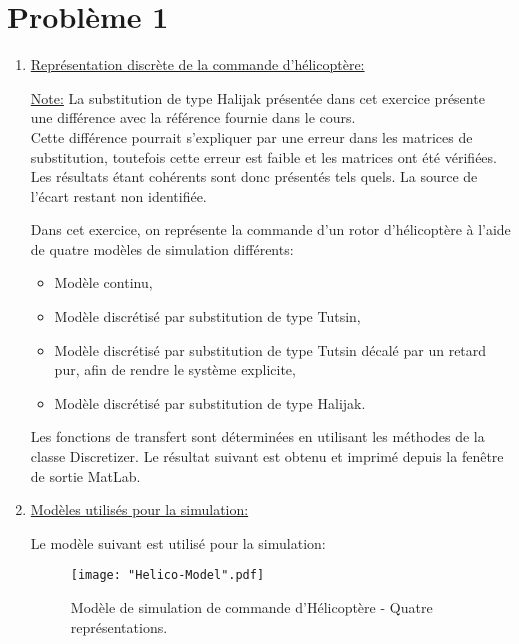 \documentclass[a4paper,12pt,fleqn]{article}
\begin{document}
\section{\textbf{Problème 1}}
\begin{enumerate}

\item \underline{Représentation discrète de la commande d'hélicoptère:}

 \underline{Note:}
 La substitution de type Halijak présentée dans cet exercice présente une différence avec la référence fournie dans le cours.\\
 Cette différence pourrait s'expliquer par une erreur dans les matrices de substitution, toutefois cette erreur est faible et les matrices ont été vérifiées.\\
 Les résultats étant cohérents sont donc présentés tels quels. La source de l'écart restant non identifiée.
 
Dans cet exercice, on représente la commande d'un rotor d'hélicoptère à l'aide de quatre modèles de simulation différents:

\begin{itemize}
  \item Modèle continu,
  \item Modèle discrétisé par substitution de type Tutsin,
  \item Modèle discrétisé par substitution de type Tutsin décalé par un retard pur, afin de rendre le système explicite,
  \item Modèle discrétisé par substitution de type Halijak.
\end{itemize}

Les fonctions de transfert sont déterminées en utilisant les méthodes de la classe Discretizer. Le résultat suivant est obtenu et imprimé depuis la fenêtre de sortie MatLab.



\item \underline{Modèles utilisés pour la simulation:}

Le modèle suivant est utilisé pour la simulation:

\begin{figure}[htb]
\centering
    \texttt{[image: "Helico-Model".pdf]}
    \caption{Modèle de simulation de commande d'Hélicoptère - Quatre représentations.}
\end{figure}
\FloatBarrier


\end{enumerate}
\end{document}
